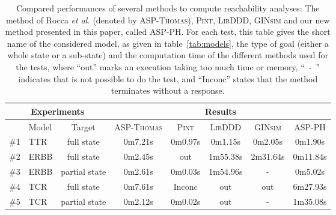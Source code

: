 \begin{table*}[ht]
\begin{center}
\noindent%
\begin{tabular}{|l|l|c||c|c|c|c|c|}
\hline
  \multicolumn{3}{|c||}{Experiments} & \multicolumn{5}{c|}{Results} \\
\hline
  & Model & Target & \textsc{ASP-Thomas} & \textsc{Pint} & \textsc{LibDDD} & \textsc{GINsim} & \textsc{ASP-PH} \\
\hline
\hline
  \#1 & TTR & full state & 0m7.21s & 0m0.97s & 0m1.15s &  0m2.05s & 0m1.90s \\
\hline
  \#2 & ERBB & full state & 0m2.45s & out &1m55.38s & 2m31.64s & 0m11.84s \\
\hline
  \#3 & ERBB & partial state & 0m2.61s & 0m0.03s &1m54.96s & - & 0m5.02s \\
\hline
  \#4 & TCR & full state & 0m7.61s & Inconc & out & out & 6m27.93s \\
\hline
  \#5 & TCR & partial state & 0m2.12s & 0m0.02s & out & - & 1m35.08s \\
\hline
\end{tabular}
\vspace*{4pt}
\caption{\label{tab:reachability}
Compared performances of several methods to compute reachability analyses:
The method of Rocca \textit{et al.} (denoted by \textsc{ASP-Thomas}), \textsc{Pint}, \textsc{LibDDD}, \textsc{GINsim} and our new method presented in this paper, called \textsc{ASP-PH}.
For each test, this table gives the short name of the considered model,
as given in table~\ref{tab:models},
the type of goal (either a whole state or a sub-state)
and the computation time of the different methods used for the tests,
where “out” marks an execution taking too much time or memory,
\mbox{“~-~”} indicates that is not possible to do the test,
and “Inconc” states that the method terminates without a response.
}
\end{center}
\end{table*}


